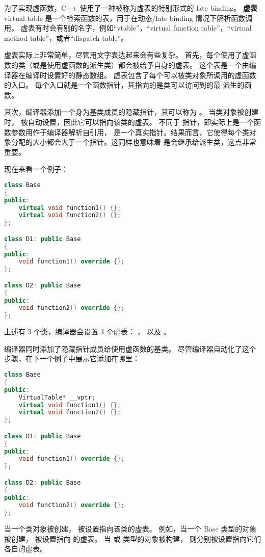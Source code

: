 \documentclass[../../LearnCpp.tex]{subfiles}
\begin{document}

为了实现虚函数，C++ 使用了一种被称为虚表的特别形式的 late binding。
\textbf{虚表} virtual table 是一个检索函数的表，用于在动态/late binding 情况下解析函数调用。
虚表有时会有别的名字，例如“vtable”，“virtual function table”，“virtual method table”，或者“dispatch table”。

虚表实际上非常简单，尽管用文字表达起来会有些复杂。
首先，每个使用了虚函数的类（或是使用虚函数的派生类）都会被给予自身的虚表。
这个表是一个由编译器在编译时设置好的静态数组。
虚表包含了每个可以被类对象所调用的虚函数的入口。
每个入口就是一个函数指针，其指向的是类可以访问到的最-派生的函数。

其次，编译器添加一个身为基类成员的隐藏指针，其可以称为 。
当类对象被创建时，  被自动设置，因此它可以指向该类的虚表。
不同于  指针，即实际上是一个函数参数用作于编译器解析自引用， 是一个真实指针。结果而言，它使得每个类对象分配的大小都会大于一个指针。这同样也意味着  是会继承给派生类，这点非常重要。

现在来看一个例子：

\begin{lstlisting}[language=C++]
class Base
{
public:
    virtual void function1() {};
    virtual void function2() {};
};

class D1: public Base
{
public:
    void function1() override {};
};

class D2: public Base
{
public:
    void function2() override {};
};
\end{lstlisting}

上述有 3 个类，编译器会设置 3 个虚表： ， 以及 。

编译器同时添加了隐藏指针成员给使用虚函数的基类。
尽管编译器自动化了这个步骤，在下一个例子中展示它添加在哪里：

\begin{lstlisting}[language=C++]
class Base
{
public:
    VirtualTable* __vptr;
    virtual void function1() {};
    virtual void function2() {};
};

class D1: public Base
{
public:
    void function1() override {};
};

class D2: public Base
{
public:
    void function2() override {};
};
\end{lstlisting}

当一个类对象被创建， 被设置指向该类的虚表。
例如，当一个 Base 类型的对象被创建， 被设置指向  的虚表。
当  或  类型的对象被构建， 则分别被设置指向它们各自的虚表。
\end{document}
